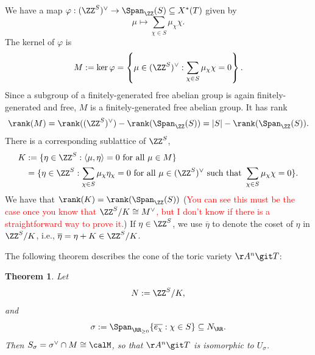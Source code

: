 \documentclass[12pt]{amsart}
\theoremstyle{plain}
\newtheorem{theorem}{Theorem}%
\begin{document}
We have a map $\varphi:(\ZZ^S)^\vee \to \Span_\ZZ(S) \subseteq X^*(T)$ given by
$$\mu \mapsto \sum_{\chi\in S} \mu_\chi \chi.$$
The kernel of $\varphi$ is
$$M := \ker \varphi = \left\{\mu \in (\ZZ^S)^\vee : \sum_{\chi \in S} \mu_\chi \chi = 0\right\}.$$
Since a subgroup of a finitely-generated free abelian group is again finitely-generated and free, $M$ is a finitely-generated free abelian group.
It has rank
$$\rank(M) = \rank((\ZZ^S)^\vee) - \rank(\Span_\ZZ(S)) = |S| - \rank(\Span_\ZZ(S)).$$
There is a corresponding sublattice of $\ZZ^S$, 
\begin{align*}
	K &:= \{\eta \in \ZZ^S : \langle \mu, \eta \rangle = 0 \text{ for all } \mu \in M\} \\
	   &= \{\eta \in \ZZ^S : \sum_{\chi \in S} \mu_\chi \eta_\chi = 0 \text{ for all } \mu \in (\ZZ^S)^\vee \text{ such that } \sum_{\chi \in S} \mu_\chi \chi = 0 \}.
\end{align*}
We have that $\rank(K) = \rank(\Span_\ZZ(S))$ (\textcolor{red}{You can see this must be the case once you know that $\ZZ^S/K \cong M^\vee$, but I don't know if there is a straightforward way to prove it.})
If $\eta \in \ZZ^S$, we use $\overline{\eta}$ to denote the coset of $\eta$ in $\ZZ^S/K$, i.e., $\overline{\eta} = \eta + K \in \ZZ^S/K$.

The following theorem describes the cone of the toric variety $\AA^n \git T$:

\begin{theorem}\label{gitlatticetheorem}
Let 
$$N := \ZZ^S / K,$$
and 
$$\sigma := \Span_{\RR_{\ge 0}} \{\overline{e_\chi} : \chi \in S\} \subseteq N_\RR.$$
Then $S_\sigma = \sigma^\vee \cap M \cong \calM$, so that $\AA^n \git T$ is isomorphic to $U_\sigma$.
\end{theorem}
\end{document}
